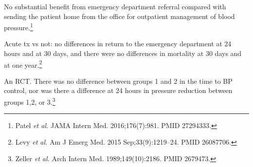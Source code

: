 \documentclass{tufte-handout}
\begin{document}
No substantial benefit from emergency department referral compared
with sending the patient home from the office for outpatient
management of blood pressure.\footnote{Patel \emph{et al.} JAMA Intern Med.
  2016;176(7):981. PMID 27294333.}

Acute tx vs not: no differences in return to the emergency department
at 24 hours and at 30 days, and there were no differences in mortality
at 30 days and at one year.\footnote{Levy \emph{et al.} Am J Emerg Med. 2015
  Sep;33(9):1219--24. PMID 26087706.}

An RCT. There was no difference between groups 1 and 2 in the time to
BP control, nor was there a difference at 24 hours in pressure
reduction between groups 1,2, or 3.\footnote{Zeller \emph{et al.} Arch Intern
  Med. 1989;149(10):2186. PMID 2679473.}
\end{document}
